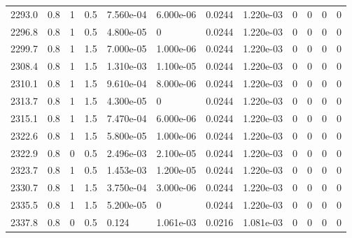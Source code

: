 \documentclass[preview]{standalone}
\begin{document}
{{{{{{{{{{{{{\begin{tabular}{L{1.2cm}C{1.2cm} C{0.3cm}C{0.5cm} C{1.4cm}C{1.4cm} C{1.4cm}C{1.4cm} C{1.6cm}C{1.6cm} C{1.6cm}C{1.6cm}}
  2293.0  &   0.8  & 1     & 0.5 &  7.560e-04  & 6.000e-06  &  0.0244&   1.220e-03& 0 & 0   &  0 & 0  \\ 
  2296.8  &   0.8  & 1     & 0.5 &  4.800e-05  & 0  &  0.0244&   1.220e-03& 0 & 0   &  0 & 0  \\ 
  2299.7  &   0.8  & 1     & 1.5 &  7.000e-05  & 1.000e-06  &  0.0244&   1.220e-03& 0 & 0   &  0 & 0  \\ 
  2308.4  &   0.8  & 1     & 1.5 &  1.310e-03  & 1.100e-05  &  0.0244&   1.220e-03& 0 & 0   &  0 & 0  \\ 
  2310.1  &   0.8  & 1     & 1.5 &  9.610e-04  & 8.000e-06  &  0.0244&   1.220e-03& 0 & 0   &  0 & 0  \\ 
  2313.7  &   0.8  & 1     & 1.5 &  4.300e-05  & 0  &  0.0244&   1.220e-03& 0 & 0   &  0 & 0  \\ 
  2315.1  &   0.8  & 1     & 1.5 &  7.470e-04  & 6.000e-06  &  0.0244&   1.220e-03& 0 & 0   &  0 & 0  \\ 
  2322.6  &   0.8  & 1     & 1.5 &  5.800e-05  & 1.000e-06  &  0.0244&   1.220e-03& 0 & 0   &  0 & 0  \\ 
  2322.9  &   0.8  & 0     & 0.5 &  2.496e-03  & 2.100e-05  &  0.0244&   1.220e-03& 0 & 0   &  0 & 0  \\ 
  2323.7  &   0.8  & 1     & 0.5 &  1.453e-03  & 1.200e-05  &  0.0244&   1.220e-03& 0 & 0   &  0 & 0  \\ 
  2330.7  &   0.8  & 1     & 1.5 &  3.750e-04  & 3.000e-06  &  0.0244&   1.220e-03& 0 & 0   &  0 & 0  \\ 
  2335.5  &   0.8  & 1     & 1.5 &  5.200e-05  & 0  &  0.0244&   1.220e-03& 0 & 0   &  0 & 0  \\ 
  2337.8  &   0.8  & 0     & 0.5 &  0.124  & 1.061e-03  &  0.0216&   1.081e-03& 0 & 0   &  0 & 0  \\ 
\hline 
\end{tabular} 

}}}}}}}}}}}}}
\end{document}
